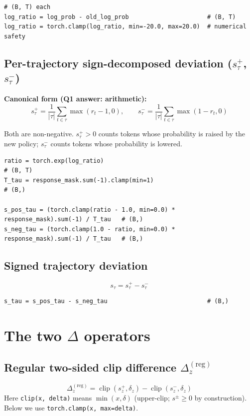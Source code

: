 \documentclass{article}
\begin{document}
\begin{lstlisting}[caption={log ratio (verl standard)}]
# (B, T) each
log_ratio = log_prob - old_log_prob                      # (B, T)
log_ratio = torch.clamp(log_ratio, min=-20.0, max=20.0)  # numerical safety
\end{lstlisting}

\subsection{Per-trajectory sign-decomposed deviation ($s_\tau^+$, $s_\tau^-$)}

\textbf{Canonical form (Q1 answer: arithmetic):}
\[
s_\tau^+ = \frac{1}{|\tau|} \sum_{t \in \tau} \max(r_t - 1, 0),
\qquad
s_\tau^- = \frac{1}{|\tau|} \sum_{t \in \tau} \max(1 - r_t, 0)
\]

Both are non-negative. $s_\tau^+ > 0$ counts tokens whose probability is
raised by the new policy; $s_\tau^-$ counts tokens whose probability is
lowered.

\begin{lstlisting}[caption={arithmetic form (per Q1 answer)}]
ratio = torch.exp(log_ratio)                                              # (B, T)
T_tau = response_mask.sum(-1).clamp(min=1)                                # (B,)

s_pos_tau = (torch.clamp(ratio - 1.0, min=0.0) * response_mask).sum(-1) / T_tau   # (B,)
s_neg_tau = (torch.clamp(1.0 - ratio, min=0.0) * response_mask).sum(-1) / T_tau   # (B,)
\end{lstlisting}

\subsection{Signed trajectory deviation}
\[
s_\tau = s_\tau^+ - s_\tau^-
\]

\begin{lstlisting}
s_tau = s_pos_tau - s_neg_tau                            # (B,)
\end{lstlisting}

\section{The two $\Delta$ operators}

\subsection{Regular two-sided clip difference $\Delta_z^{(\text{reg})}$}
\[
\Delta_z^{(\text{reg})} = \operatorname{clip}(s_z^+, \delta_z) - \operatorname{clip}(s_z^-, \delta_z)
\]
Here \verb|clip(x, delta)| means $\min(x, \delta)$ (upper-clip; $s^\pm \ge 0$
by construction). Below we use \verb|torch.clamp(x, max=delta)|.
\end{document}
